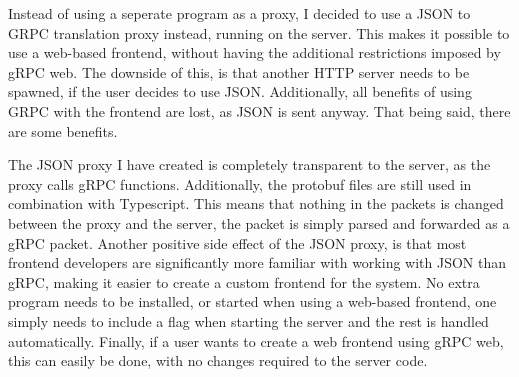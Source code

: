 Instead of using a seperate program as a proxy, I decided to use a JSON to GRPC translation proxy instead, running on the server. This makes it possible to use a web-based frontend, without having the additional restrictions imposed by gRPC web. The downside of this, is that another HTTP server needs to be spawned, if the user decides to use JSON. Additionally, all benefits of using GRPC with the frontend are lost, as JSON is sent anyway. That being said, there are some benefits.

The JSON proxy I have created is completely transparent to the server, as the proxy calls gRPC functions. Additionally, the protobuf files are still used in combination with Typescript. This means that nothing in the packets is changed between the proxy and the server, the packet is simply parsed and forwarded as a gRPC packet. Another positive side effect of the JSON proxy, is that most frontend developers are significantly more familiar with working with JSON than gRPC, making it easier to create a custom frontend for the system. No extra program needs to be installed, or started when using a web-based frontend, one simply needs to include a flag when starting the server and the rest is handled automatically. Finally, if a user wants to create a web frontend using gRPC web, this can easily be done, with no changes required to the server code.

